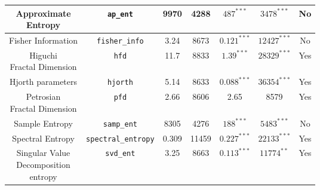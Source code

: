 \begin {table}[H]
\begin{center}
\begin{tabular}{|c|c|c|c|c|c|c|}
  \hline
  \hline
\specialcell{Approximate\\Entropy} & \texttt{ap\_ent} & 									9970 & 4288 & $487^{***}$ & $3478^{***}$ & No\\
\hline
Fisher Information & \texttt{fisher\_info} & 								3.24 & 8673 & $0.121^{***}$ & $12427^{***}$ & No\\
\hline
\specialcell{Higuchi\\Fractal Dimension} & \texttt{hfd} &	 				11.7 & 8833 & $1.39^{***}$ & $28329^{***}$ & Yes\\
\hline
Hjorth parameters & \texttt{hjorth} & 										5.14 & 8633 & $0.088^{***}$ & $36354^{***}$ & Yes\\
\hline
\specialcell{Petrosian\\Fractal Dimension} & \texttt{pfd} & 				2.66 & 8606 & 2.65 & 8579 & Yes\\
\hline
Sample Entropy & \texttt{samp\_ent} & 										8305 & 4276 & $188^{***}$ & $5483^{***}$ & No\\
\hline
Spectral Entropy & \texttt{spectral\_entropy} & 								0.309 & 11459 & $0.227^{***}$ & $22133^{***}$ & Yes\\
\hline
\specialcell[l]{Singular Value \\Decomposition\\ entropy} & \texttt{svd\_ent} & 	3.25 & 8663 & $0.113^{***}$ & $11774^{**}$ & Yes\\
 \hline


\end{tabular}
\end{center}
\end{table}
